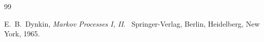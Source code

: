 \documentclass[12pt,a4paper]{article}
\newcommand{\1}{{\bf 1}}
\begin{document}
\begin{thebibliography}{99}


% 
%


%

        {E.~B.~Dynkin},
        \emph{Markov Processes I, II}. \
         Springer-Verlag, Berlin, Heidelberg, New York, 1965.

 
 
% 
% 
%



\end{thebibliography}
\end{document}
